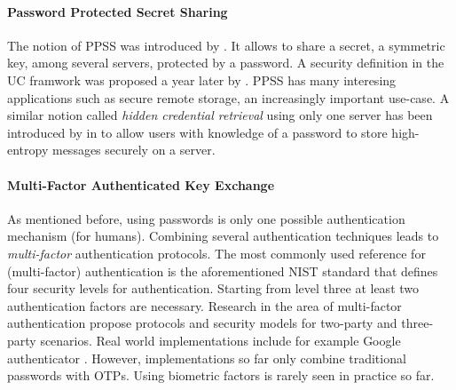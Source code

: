 \paragraph{Password Protected Secret Sharing}
The notion of \ac{PPSS} was introduced by \citeauthor{Bagherzandi2011} \cite{Bagherzandi2011}.
It allows to share a secret, \eg a symmetric key, among several servers, protected by a password. 
A security definition in the \acl{UC} framwork was proposed a year later by \citeauthor{Camenisch2012} \cite{Camenisch2012}.
\ac{PPSS} has many interesing applications such as secure remote storage, an increasingly important use-case.
A similar notion called \emph{hidden credential retrieval} using only one server has been introduced by \citeauthor{Boyen09} in \cite{Boyen09} to allow users with knowledge of a password to store high-entropy messages securely on a server.



\paragraph{Multi-Factor Authenticated Key Exchange}
As mentioned before, using passwords is only one possible authentication mechanism (for humans).
Combining several authentication techniques leads to \emph{multi-factor} authentication protocols.
The most commonly used reference for (multi-factor) authentication is the aforementioned \ac{NIST} standard \cite{Burr11} that defines four security levels for authentication.
Starting from level three at least two authentication factors are necessary.
Research in the area of multi-factor authentication \cite{PointchevalZ08,SUC10,LiuWM10,HaoC12} propose protocols and security models for two-party and three-party scenarios.
Real world implementations include for example Google authenticator \cite{GAuthenticator}.
However, implementations so far only combine traditional passwords with \aclp{OTP}.
Using biometric factors is rarely seen in practice so far.


